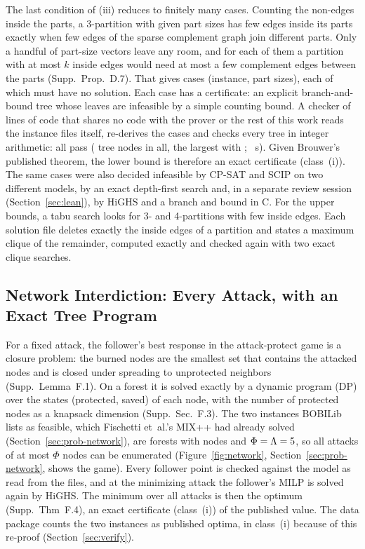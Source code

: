 \documentclass[]{spie}  %
\theoremstyle{plain}
\newcommand{\supp}[1]{Supp.\ Sec.~#1}
\newcommand{\cls}[1]{class~(#1)}             %
\begin{document}
The last condition of (iii) reduces to finitely many cases. Counting the non-edges inside the
parts, a 3-partition with given part sizes has few edges inside its parts exactly when few
edges of the sparse complement graph join different parts. Only a handful of part-size vectors
leave any room, and for each of them a partition with at most $k$ inside edges would need at most
a few complement edges between the parts (Supp.\ Prop.~D.7). That gives \NumCliquePartCases{}
cases (instance, part sizes), each of which must have no solution. Each case has a certificate: an
explicit branch-and-bound tree whose leaves are infeasible by a simple counting bound. A checker
of \CliqueCheckerLines{} lines of code that shares no code with the prover or the rest of this work reads
the instance files itself, re-derives the cases and checks every tree in integer arithmetic: all
\CliqueCertCases{} pass (\CliqueCertNodes{} tree nodes in all, the largest with
\CliqueCertMaxNodes{}; \CliqueCertSeconds{}~s). Given Brouwer's published theorem, the lower
bound \CliqueOptNine{} is therefore an exact certificate (\cls{i}). The same cases were also decided infeasible
by \mbox{CP-SAT}\cite{perron2026cpsat} and SCIP\cite{hojny2025scip,maher2016pyscipopt} on two different
models, by an exact depth-first search and, in a separate review session
(Section~\ref{sec:lean}), by HiGHS and a branch and bound in C. For the upper bounds, a tabu search looks for 3- and 4-partitions with few inside
edges. Each solution file deletes exactly the inside edges of a partition and states a maximum
clique of the remainder, computed exactly and checked again with two exact clique
searches.\cite{bron1973algorithm,tomita2006worst,carraghan1990exact}

\subsection{Network Interdiction: Every Attack, with an Exact Tree Program}\label{sec:network}

For a fixed attack, the follower's best response in the attack-protect game is a closure problem:
the burned nodes are the smallest set that contains the attacked nodes and is closed under
spreading to unprotected neighbors (Supp.\ Lemma~F.1). On a forest it is solved exactly by a
dynamic program (DP) over the states (protected, saved) of each node, with the number of
protected nodes as a knapsack dimension (\supp{F.3}). The two instances BOBILib lists as
feasible, which Fischetti et~al.'s MIX++ had already solved (Section~\ref{sec:prob-network}), are
forests with \NetworkNodes{} nodes and $\Phi=\Lambda=5$, so all
\NetworkAttacks{} attacks of at most $\Phi$ nodes can be enumerated (Figure~\ref{fig:network},
Section~\ref{sec:prob-network}, shows the game).
Every follower point is checked against the model as read from the files, and at the minimizing
attack the follower's MILP is solved again by HiGHS. The minimum over all attacks is then the
optimum (Supp.\ Thm~F.4), an exact certificate (\cls{i}) of the published value. The data package
counts the two instances as published optima, in \cls{i} because of this re-proof
(Section~\ref{sec:verify}).
\end{document}
